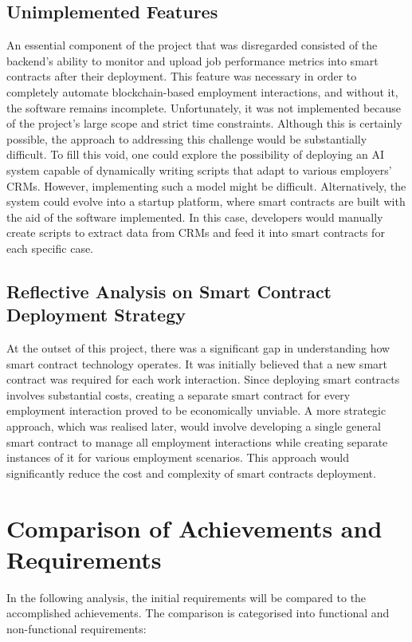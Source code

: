 \subsection{Unimplemented Features}

An essential component of the project that was disregarded consisted of the backend's ability to monitor and upload job performance metrics into smart contracts after their deployment. This feature was necessary in order to completely automate blockchain-based employment interactions, and without it, the software remains incomplete. Unfortunately, it was not implemented because of the project's large scope and strict time constraints. Although this is certainly possible, the approach to addressing this challenge would be substantially difficult. To fill this void, one could explore the possibility of deploying an AI system capable of dynamically writing scripts that adapt to various employers' CRMs. However, implementing such a model might be difficult. Alternatively, the system could evolve into a startup platform, where smart contracts are built with the aid of the software implemented. In this case, developers would manually create scripts to extract data from CRMs and feed it into smart contracts for each specific case.  

\subsection{Reflective Analysis on Smart Contract Deployment Strategy}

At the outset of this project, there was a significant gap in understanding how smart contract technology operates. It was initially believed that a new smart contract was required for each work interaction. Since deploying smart contracts involves substantial costs, creating a separate smart contract for every employment interaction proved to be economically unviable. A more strategic approach, which was realised later, would involve developing a single general smart contract to manage all employment interactions while creating separate instances of it for various employment scenarios. This approach would significantly reduce the cost and complexity of smart contracts deployment.

\section{Comparison of Achievements and Requirements}

In the following analysis, the initial requirements will be compared to the accomplished achievements. The comparison is categorised into functional and non-functional requirements:

